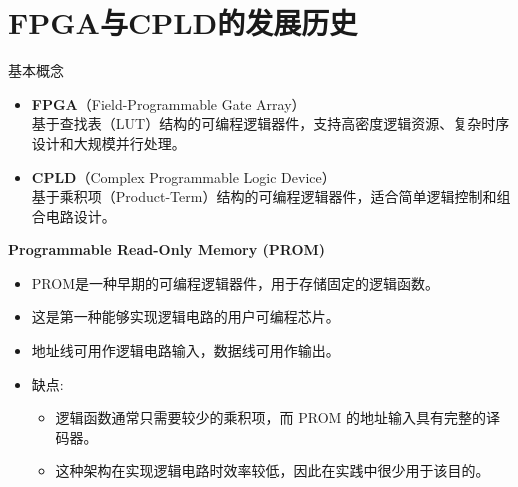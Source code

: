 \section{FPGA与CPLD的发展历史}

\begin{frame}{基本概念}
    \begin{itemize}
    \item
        \textbf{FPGA}（Field-Programmable Gate Array）\\
        基于查找表（LUT）结构的可编程逻辑器件，支持高密度逻辑资源、复杂时序设计和大规模并行处理。
    \item
        \textbf{CPLD}（Complex Programmable Logic Device）\\
        基于乘积项（Product-Term）结构的可编程逻辑器件，适合简单逻辑控制和组合电路设计。
    \end{itemize}
\end{frame}


\begin{frame}{\textbf{Programmable Read-Only Memory (PROM)}}
\begin{itemize}
\tightlist
\item PROM是一种早期的可编程逻辑器件，用于存储固定的逻辑函数。
\item
    这是第一种能够实现逻辑电路的用户可编程芯片。
\item
    地址线可用作逻辑电路输入，数据线可用作输出。
\item
    缺点:

    \begin{itemize}
    \tightlist
    \item
    逻辑函数通常只需要较少的乘积项，而 PROM 的地址输入具有完整的译码器。
    \item
    这种架构在实现逻辑电路时效率较低，因此在实践中很少用于该目的。
    \end{itemize}
\end{itemize}
\end{frame}


